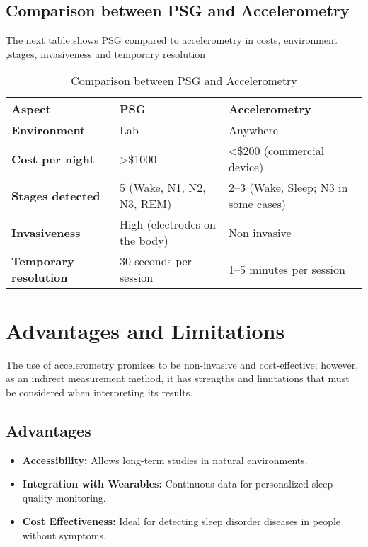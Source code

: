 \documentclass[conference]{IEEEtran}
\begin{document}
\subsection{Comparison between PSG and Accelerometry}
    The next table shows PSG compared to accelerometry in costs, environment ,stages, invasiveness and temporary resolution

\begin{table}[h]
\centering
\small
\begin{tabular}{|p{1.4cm}|p{3.0cm}|p{3.4cm}|}
\hline
\textbf{Aspect} & \textbf{PSG} & \textbf{Accelerometry} \\
\hline
\textbf{Environment} & Lab & Anywhere \\
\hline
\textbf{Cost per night} & >\$1000 & <\$200 (commercial device) \\
\hline
\textbf{Stages detected} & 5 (Wake, N1, N2, N3, REM) & 2--3 (Wake, Sleep; N3 in some cases) \\
\hline
\textbf{Invasiveness} & High (electrodes on the body) & Non invasive \\
\hline
\textbf{Temporary resolution} & 30 seconds per session & 1--5 minutes per session \\
\hline
\end{tabular}
\caption{Comparison between PSG and Accelerometry}
\label{tab:psg-vs-acelerometry}
\end{table}

\section{Advantages and Limitations}

The use of accelerometry promises to be non-invasive and cost-effective; however, as an indirect measurement method, it has strengths and limitations that must be considered when interpreting its results.

\subsection{Advantages}

\begin{itemize}
	\item \textbf{Accessibility:} Allows long-term studies in natural environments.
	\item \textbf{Integration with Wearables:} Continuous data for personalized sleep quality monitoring.
    \item \textbf{Cost Effectiveness:} Ideal for detecting sleep disorder diseases in people without symptoms.
\end{itemize}
\end{document}
